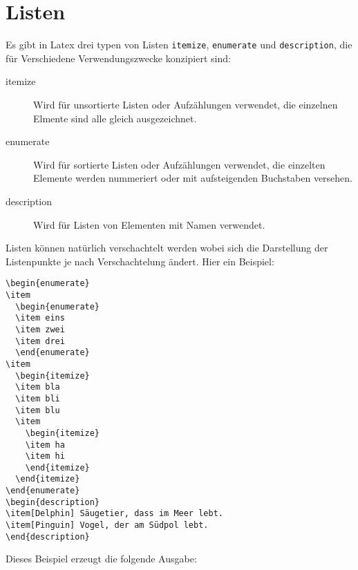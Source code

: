\section{Listen}
Es gibt in Latex drei typen von Listen \verb+itemize+, \verb+enumerate+ und \verb+description+, die für
Verschiedene Verwendungszwecke konzipiert sind:
\begin{description}
\item[itemize] Wird für unsortierte Listen oder Aufzählungen verwendet, die einzelnen Elmente sind alle
  gleich ausgezeichnet.
\item[enumerate] Wird für sortierte Listen oder Aufzählungen verwendet, die einzelten Elemente werden
  nummeriert oder mit aufsteigenden Buchstaben versehen.
\item[description] Wird für Listen von Elementen mit Namen verwendet. 
\end{description}
Listen können natürlich verschachtelt werden wobei sich die Darstellung der Listenpunkte je nach Verschachtelung
ändert. Hier ein Beispiel:
\begin{verbatim}
\begin{enumerate}
\item
  \begin{enumerate}
  \item eins
  \item zwei
  \item drei
  \end{enumerate}
\item
  \begin{itemize}
  \item bla
  \item bli
  \item blu
  \item
    \begin{itemize}
    \item ha
    \item hi
    \end{itemize}
  \end{itemize}
\end{enumerate}
\begin{description}
\item[Delphin] Säugetier, dass im Meer lebt.
\item[Pinguin] Vogel, der am Südpol lebt. 
\end{description}
\end{verbatim}
Dieses Beispiel erzeugt die folgende Ausgabe:
